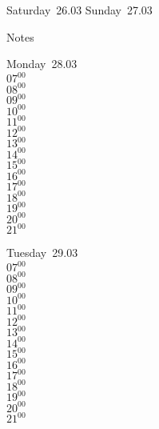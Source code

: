 \documentclass[11pt,a4paper]{book}\usepackage[]{graphicx}\usepackage[]{color}
\begin{document}
\begin{weekendbox}
  Saturday~26.03
  \tcblower
  Sunday~27.03
\end{weekendbox} %
\begin{notebox}
  Notes
\end{notebox}
\clearpage
\begin{headerbox}
\end{headerbox}
\begin{weekdaybox}
  Monday~28.03\\
  { 
  \vfill
  $07^{00}$\\
$08^{00}$\\
$09^{00}$\\
$10^{00}$\\
$11^{00}$\\
$12^{00}$\\
$13^{00}$\\
$14^{00}$\\
$15^{00}$\\
$16^{00}$\\
$17^{00}$\\
$18^{00}$\\
$19^{00}$\\
$20^{00}$\\
$21^{00}$\\
  }
\end{weekdaybox}
\begin{weekdaybox}
  Tuesday~29.03\\
  { 
  \vfill
  $07^{00}$\\
$08^{00}$\\
$09^{00}$\\
$10^{00}$\\
$11^{00}$\\
$12^{00}$\\
$13^{00}$\\
$14^{00}$\\
$15^{00}$\\
$16^{00}$\\
$17^{00}$\\
$18^{00}$\\
$19^{00}$\\
$20^{00}$\\
$21^{00}$\\
  }
\end{weekdaybox}
\end{document}
